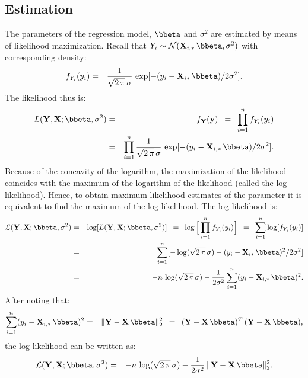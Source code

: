 \documentclass[a4paper]{article}
\theoremstyle{myexamplestyle}
\begin{document}
\subsection{Estimation}
The parameters of the regression model, $\bbeta$ and $\sigma^2$ are estimated by means of likelihood maximization. Recall that $Y_i \sim \mathcal{N}( \mathbf{X}_{i,\ast} \, \bbeta, \sigma^2)$ with corresponding density:
\begin{eqnarray*}
f_{Y_i}(y_i) & = & \frac{1}{\sqrt{2 \, \pi} \, \sigma} \, \exp[ - (y_i - \mathbf{X}_{i\ast} \, \bbeta) / 2 \sigma^2 ].
\end{eqnarray*}
The likelihood thus is:
\begin{eqnarray*}
L(\mathbf{Y}, \mathbf{X}; \bbeta, \sigma^2) & = & f_{\mathbf{Y}}(\mathbf{y}) \, \, \, = \, \, \, \prod_{i=1}^n f_{Y_i}(y_i)
\\
& = & \prod_{i=1}^n  \frac{1}{\sqrt{2 \, \pi} \, \sigma} \, \exp[ - (y_i - \mathbf{X}_{i, \ast} \, \bbeta) / 2 \sigma^2 ].
\end{eqnarray*}
Because of the concavity of the logarithm, the maximization of the likelihood coincides with the maximum of the logarithm of the likelihood (called the log-likelihood). Hence, to obtain maximum likelihood estimates of the parameter it is equivalent to find the maximum of the log-likelihood. The log-likelihood is:
\begin{eqnarray*}
\mathcal{L}(\mathbf{Y}, \mathbf{X}; \bbeta, \sigma^2) & = & 
\log[ L(\mathbf{Y}, \mathbf{X}; \bbeta, \sigma^2) ]
\, \, \, = \, \, \, \log \Big[  \prod_{i=1}^n f_{Y_i}(y_i) \Big]
\, \, \, = \, \, \, \sum_{i=1}^n \log[ f_{Y_i}(y_i) ]
\\
& = & \sum_{i=1}^n [ -\log(\sqrt{2 \, \pi} \, \sigma) -  (y_i - \mathbf{X}_{i\ast} \, \bbeta)^2 / 2 \sigma^2  ]
\\
& = & -n \, \log(\sqrt{2 \, \pi} \, \sigma) -  \frac{1}{ 2 \sigma^2} \sum_{i=1}^n (y_i - \mathbf{X}_{i, \ast} \, \bbeta)^2.
\end{eqnarray*}
After noting that:
\begin{eqnarray*}
\sum_{i=1}^n (y_i - \mathbf{X}_{i, \ast} \, \bbeta)^2 & = & \| \mathbf{Y} - \mathbf{X} \, \bbeta \|^2_2 \, \, \, = \, \, \, (\mathbf{Y} - \mathbf{X} \, \bbeta)^T \, (\mathbf{Y} - \mathbf{X} \, \bbeta), 
\end{eqnarray*}
the log-likelihood can be written as:
\begin{eqnarray*}
\mathcal{L}(\mathbf{Y}, \mathbf{X}; \bbeta, \sigma^2) & = & -n \, \log(\sqrt{2 \, \pi} \, \sigma) -  \frac{1}{ 2 \sigma^2} \, \| \mathbf{Y} - \mathbf{X} \, \bbeta \|^2_2.
\end{eqnarray*}
\end{document}
